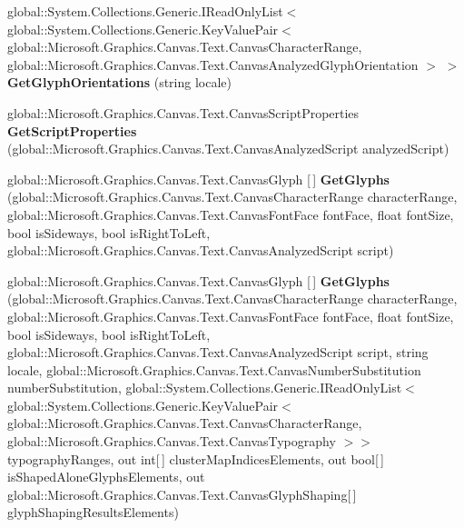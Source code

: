 \begin{DoxyCompactItemize}
\item 
\mbox{\label{class_microsoft_1_1_graphics_1_1_canvas_1_1_text_1_1_canvas_text_analyzer_a5d9bd343724b86e778507b295082ef00}} 
global\+::\+System.\+Collections.\+Generic.\+I\+Read\+Only\+List$<$ global\+::\+System.\+Collections.\+Generic.\+Key\+Value\+Pair$<$ global\+::\+Microsoft.\+Graphics.\+Canvas.\+Text.\+Canvas\+Character\+Range, global\+::\+Microsoft.\+Graphics.\+Canvas.\+Text.\+Canvas\+Analyzed\+Glyph\+Orientation $>$ $>$ {\bfseries Get\+Glyph\+Orientations} (string locale)
\item 
\mbox{\label{class_microsoft_1_1_graphics_1_1_canvas_1_1_text_1_1_canvas_text_analyzer_a523f4325687e72e2b6f23ffbf0876b73}} 
global\+::\+Microsoft.\+Graphics.\+Canvas.\+Text.\+Canvas\+Script\+Properties {\bfseries Get\+Script\+Properties} (global\+::\+Microsoft.\+Graphics.\+Canvas.\+Text.\+Canvas\+Analyzed\+Script analyzed\+Script)
\item 
\mbox{\label{class_microsoft_1_1_graphics_1_1_canvas_1_1_text_1_1_canvas_text_analyzer_ac117d4010da0dcaf5afcc757320c6f8f}} 
global\+::\+Microsoft.\+Graphics.\+Canvas.\+Text.\+Canvas\+Glyph \mbox{[}$\,$\mbox{]} {\bfseries Get\+Glyphs} (global\+::\+Microsoft.\+Graphics.\+Canvas.\+Text.\+Canvas\+Character\+Range character\+Range, global\+::\+Microsoft.\+Graphics.\+Canvas.\+Text.\+Canvas\+Font\+Face font\+Face, float font\+Size, bool is\+Sideways, bool is\+Right\+To\+Left, global\+::\+Microsoft.\+Graphics.\+Canvas.\+Text.\+Canvas\+Analyzed\+Script script)
\item 
\mbox{\label{class_microsoft_1_1_graphics_1_1_canvas_1_1_text_1_1_canvas_text_analyzer_a96ffee25bbe4a0df427e23a2c2493f0b}} 
global\+::\+Microsoft.\+Graphics.\+Canvas.\+Text.\+Canvas\+Glyph \mbox{[}$\,$\mbox{]} {\bfseries Get\+Glyphs} (global\+::\+Microsoft.\+Graphics.\+Canvas.\+Text.\+Canvas\+Character\+Range character\+Range, global\+::\+Microsoft.\+Graphics.\+Canvas.\+Text.\+Canvas\+Font\+Face font\+Face, float font\+Size, bool is\+Sideways, bool is\+Right\+To\+Left, global\+::\+Microsoft.\+Graphics.\+Canvas.\+Text.\+Canvas\+Analyzed\+Script script, string locale, global\+::\+Microsoft.\+Graphics.\+Canvas.\+Text.\+Canvas\+Number\+Substitution number\+Substitution, global\+::\+System.\+Collections.\+Generic.\+I\+Read\+Only\+List$<$ global\+::\+System.\+Collections.\+Generic.\+Key\+Value\+Pair$<$ global\+::\+Microsoft.\+Graphics.\+Canvas.\+Text.\+Canvas\+Character\+Range, global\+::\+Microsoft.\+Graphics.\+Canvas.\+Text.\+Canvas\+Typography $>$$>$ typography\+Ranges, out int\mbox{[}$\,$\mbox{]} cluster\+Map\+Indices\+Elements, out bool\mbox{[}$\,$\mbox{]} is\+Shaped\+Alone\+Glyphs\+Elements, out global\+::\+Microsoft.\+Graphics.\+Canvas.\+Text.\+Canvas\+Glyph\+Shaping\mbox{[}$\,$\mbox{]} glyph\+Shaping\+Results\+Elements)
$$
\end{DoxyCompactItemize}
